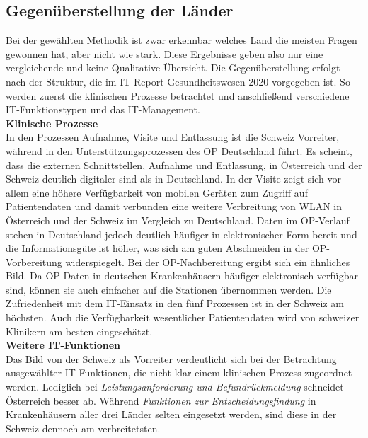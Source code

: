 \subsection{Gegenüberstellung der Länder}
Bei der gewählten Methodik ist zwar erkennbar welches Land die meisten Fragen gewonnen hat, aber nicht wie stark. Diese Ergebnisse geben also nur eine vergleichende und keine Qualitative Übersicht. Die Gegenüberstellung erfolgt nach der Struktur, die im IT-Report Gesundheitswesen 2020 vorgegeben ist. So werden zuerst die klinischen Prozesse betrachtet und anschließend verschiedene IT-Funktionstypen und das IT-Management.
\vspace{\parheadvspace}\\
\textbf{Klinische Prozesse}\\
In den Prozessen Aufnahme, Visite und Entlassung ist die Schweiz Vorreiter, während in den Unterstützungsprozessen des OP Deutschland führt. Es scheint, dass die externen Schnittstellen, Aufnahme und Entlassung, in Österreich und der Schweiz deutlich digitaler sind als in Deutschland. In der Visite zeigt sich vor allem eine höhere Verfügbarkeit von mobilen Geräten zum Zugriff auf Patientendaten und damit verbunden eine weitere Verbreitung von WLAN in Österreich und der Schweiz im Vergleich zu Deutschland. Daten im OP-Verlauf stehen in Deutschland jedoch deutlich häufiger in elektronischer Form bereit und die Informationsgüte ist höher, was sich am guten Abschneiden in der OP-Vorbereitung widerspiegelt. Bei der OP-Nachbereitung ergibt sich ein ähnliches Bild. Da OP-Daten in deutschen Krankenhäusern häufiger elektronisch verfügbar sind, können sie auch einfacher auf die Stationen übernommen werden. Die Zufriedenheit mit dem IT-Einsatz in den fünf Prozessen ist in der Schweiz am höchsten. Auch die Verfügbarkeit wesentlicher Patientendaten wird von schweizer Klinikern am besten eingeschätzt.
\vspace{\parheadvspace}\\
\textbf{Weitere IT-Funktionen}\\
Das Bild von der Schweiz als Vorreiter verdeutlicht sich bei der Betrachtung ausgewählter IT-Funktionen, die nicht klar einem klinischen Prozess zugeordnet werden. Lediglich bei \textit{Leistungsanforderung und Befundrückmeldung} schneidet Österreich besser ab. Während \textit{Funktionen zur Entscheidungsfindung} in Krankenhäusern aller drei Länder selten eingesetzt werden, sind diese in der Schweiz dennoch am verbreitetsten.
\vspace{\parheadvspace}\\
